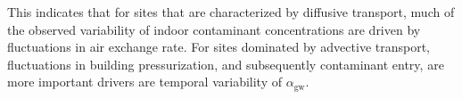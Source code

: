 This indicates that for sites that are characterized by diffusive transport, much of the observed variability of indoor contaminant concentrations are driven by fluctuations in air exchange rate.
For sites dominated by advective transport, fluctuations in building pressurization, and subsequently contaminant entry, are more important drivers are temporal variability of $\alpha_\mathrm{gw}$.\par
